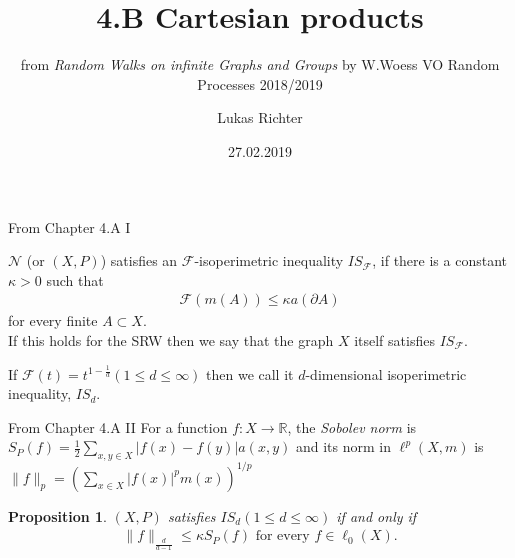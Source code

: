 \documentclass{beamer}\usepackage[]{graphicx}\usepackage[]{color}
\let\otp\titlepage
\renewcommand{\titlepage}{\otp\addtocounter{framenumber}{-1}}
\newtheorem{proposition}{Proposition}
\begin{document}
\title{4.B Cartesian products}
\subtitle{from \textit{Random Walks on infinite Graphs and Groups} by W.Woess \newline
\newline
VO Random Processes 2018/2019}
\author{Lukas Richter}
\date[]{27.02.2019} %

\begin{frame}[plain]
 \titlepage
\end{frame}

\begin{frame}[fragile]{From Chapter 4.A I}
\begin{definition}
$\mathcal{N}$ (or $(X, P)$) satisfies an $\mathcal{F}$-isoperimetric inequality $IS_{\mathcal{F}}$, if there is a constant $\kappa > 0$ such that
\begin{align*}
 \mathcal{F}(m(A)) \le \kappa a(\partial A)
\end{align*}
for every finite $A \subset X$. \\
If this holds for the SRW then we say that the graph $X$ itself satisfies $IS_{\mathcal{F}}$.
\end{definition}
\vspace{1cm}
If $\mathcal{F}(t) = t^{1-\frac{1}{d}} (1 \le d \le \infty)$ then we call it $d$-dimensional isoperimetric inequality, $IS_d$.

\end{frame}

\begin{frame}[fragile]{From Chapter 4.A II}
For a function $f:X\to \mathbb{R}$, the \textit{Sobolev norm} is $S_P(f)=\frac{1}{2}\sum_{x,y\in X} | f(x)-f(y) | a(x,y)$ and its norm in $\ell^p(X,m)$ is $\|f\|_p=\left( \sum_{x\in X}|f(x)|^p m(x) \right)^{1/p}$
\vspace{1cm}
\begin{proposition}
$(X,P)$ satisfies $IS_d (1 \le d \le \infty)$ if and only if
\begin{align*}
\|f\|_{\frac{d}{d-1}}\le \kappa S_P(f) \text{ for every } f \in \ell_0(X).
\end{align*}
\end{proposition}
\end{frame}
\end{document}

